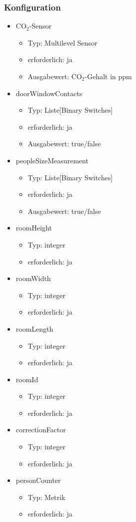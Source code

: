 \subsubsection{Konfiguration}
\begin{itemize}
	\item CO$_2$-Sensor
	\begin{itemize}
		\item Typ: Multilevel Sensor
		\item erforderlich: ja
		\item Ausgabewert: CO$_2$-Gehalt in ppm
	\end{itemize}
	\item doorWindowContacts
	\begin{itemize}
		\item Typ: Liste[Binary Switches]
		\item erforderlich: ja
		\item Ausgabewert: true/false
	\end{itemize}
	\item peopleSizeMeasurement 
	\begin{itemize}
		\item Typ: Liste[Binary Switches]
		\item erforderlich: ja
		\item Ausgabewert: true/false
	\end{itemize}
	\item roomHeight
	\begin{itemize}
		\item Typ: integer
		\item erforderlich: ja
	\end{itemize}
	\item roomWidth
	\begin{itemize}
		\item Typ: integer
		\item erforderlich: ja
	\end{itemize}
	\item roomLength
	\begin{itemize}
		\item Typ: integer
		\item erforderlich: ja
	\end{itemize}
	\item roomId
	\begin{itemize}
		\item Typ: integer
		\item erforderlich: ja
	\end{itemize}
	\item correctionFactor
	\begin{itemize}
		\item Typ: integer
		\item erforderlich: ja
	\end{itemize}
	\item personCounter
	\begin{itemize}
		\item Typ: Metrik
		\item erforderlich: ja
	\end{itemize}
\end{itemize}


